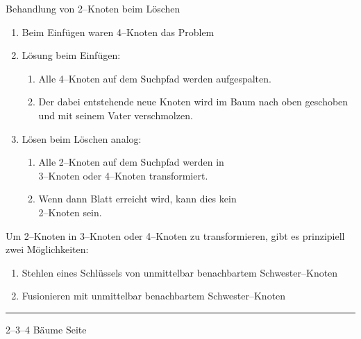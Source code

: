 \begin{slide}{}
\normalsize

\begin{center}
Behandlung von 2--Knoten beim L\"oschen
\end{center}
\vspace*{0.5cm}

\footnotesize
\begin{enumerate}
\item Beim Einf\"ugen waren 4--Knoten das Problem
\item L\"osung beim Einf\"ugen: 
  \begin{enumerate}
  \item Alle 4--Knoten auf dem Suchpfad  werden aufgespalten.
  \item Der dabei entstehende neue Knoten wird im Baum nach oben geschoben 
        und mit seinem Vater verschmolzen.
  \end{enumerate}
\item L\"osen beim L\"oschen analog:
  \begin{enumerate}
  \item Alle 2--Knoten auf dem Suchpfad werden in \\
        3--Knoten oder 4--Knoten transformiert.
  \item Wenn dann Blatt erreicht wird, kann dies kein \\
        2--Knoten sein.
  \end{enumerate}
\end{enumerate}
Um 2--Knoten in 3--Knoten oder 4--Knoten zu transformieren, gibt
es prinzipiell zwei M\"oglichkeiten:
\begin{enumerate}
\item Stehlen eines Schl\"ussels von unmittelbar benachbartem
      Schwester--Knoten
\item Fusionieren mit unmittelbar benachbartem Schwester--Knoten  
\end{enumerate}

\vspace*{\fill}
\tiny \addtocounter{mypage}{1}
\rule{17cm}{1mm}
2--3--4 B\"aume  \hspace*{\fill} Seite 
\end{slide}



